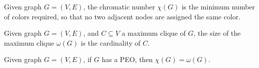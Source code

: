 
\begin{definition}
    Given graph $G = (V, E)$, the chromatic number $\chi(G)$ is the minimum number of colors required, so that no two adjacent nodes are assigned the same color.
\end{definition}

\begin{definition}
    Given graph $G = (V, E)$, and $C \subseteq V$ a maximum clique of $G$, the size of the maximum clique $\omega(G)$ is the cardinality of $C$.
\end{definition}

\begin{theorem}
    Given graph $G = (V, E)$, if $G$ has a PEO, then $\chi(G) = \omega(G)$.
\end{theorem}